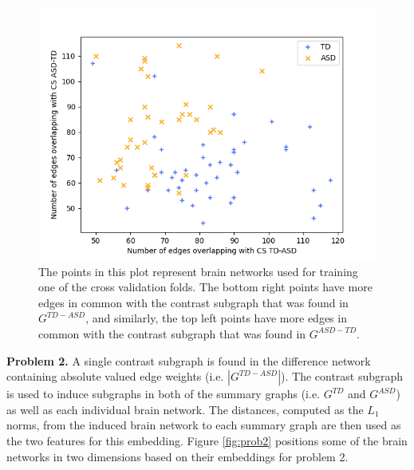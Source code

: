 \documentclass[sigconf]{acmart}
\begin{document}
\begin{figure}
    \centering
    \includegraphics[width=\columnwidth, keepaspectratio=true]{img/CSP1-SDP-Percentile-Children-4-train-labels.png}
    \caption{The points in this plot represent brain networks used for training one of the cross validation folds. The bottom right points have more edges in common with the contrast subgraph that was found in $G^{TD-ASD}$, and similarly, the top left points have more edges in common with the contrast subgraph that was found in $G^{ASD-TD}$.}
    \label{fig:prob1}
\end{figure}

\textbf{Problem 2.}
A single contrast subgraph is found in the difference network containing absolute valued edge weights (i.e. $|G^{TD - ASD}|$).
The contrast subgraph is used to induce subgraphs in both of the summary graphs (i.e. $G^{TD}$ and $G^{ASD}$) as well as each individual brain network.
The distances, computed as the $L_1$ norms, from the induced brain network to each summary graph are then used as the two features for this embedding.
Figure \ref{fig:prob2} positions some of the brain networks in two dimensions based on their embeddings for problem 2. 
\end{document}
